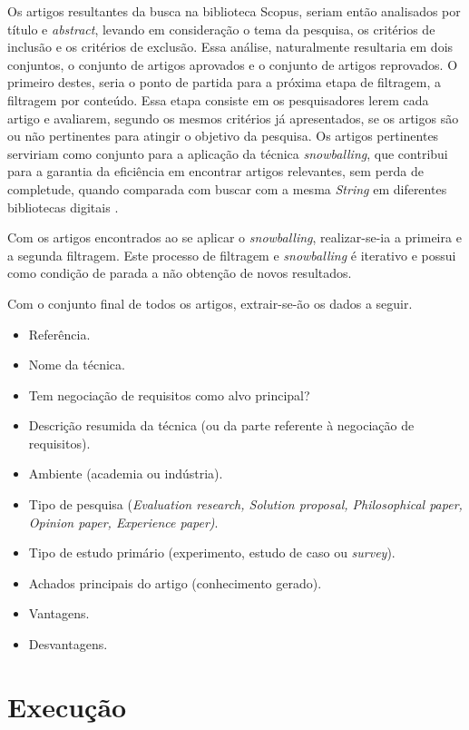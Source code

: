 Os artigos resultantes da busca na biblioteca Scopus, seriam então analisados
por título e \textit{abstract}, levando em consideração o tema da pesquisa, os
critérios de inclusão e os critérios de exclusão.
Essa análise, naturalmente resultaria em dois conjuntos, o conjunto de artigos
aprovados e o conjunto de artigos reprovados. O primeiro destes, seria o ponto
de partida para a próxima etapa de filtragem, a filtragem por conteúdo.
Essa etapa consiste em os pesquisadores lerem cada artigo e avaliarem, segundo
os mesmos critérios já apresentados, se os artigos são ou não pertinentes para atingir o objetivo da pesquisa.
 Os artigos pertinentes serviriam como conjunto para a aplicação da técnica
 \textit{snowballing}, que contribui para a garantia da eficiência em encontrar
 artigos relevantes, sem perda de completude, quando comparada com buscar com a
 mesma \textit{String} em diferentes bibliotecas digitais
 \cite{Badampudi:2015:EUS:2745802.2745818}.
 
Com os artigos encontrados ao se aplicar o \textit{snowballing}, realizar-se-ia
a primeira e a segunda filtragem.
Este processo de filtragem e \textit{snowballing} é iterativo e possui como
condição de parada a não obtenção de novos resultados.

Com o conjunto final de todos os artigos, extrair-se-ão os dados a seguir.

\begin{itemize}
\setlength{
\itemsep}{1pt}
\setlength{
\itemindent}{20pt}
\item {Referência.}
\item {Nome da técnica.}
\item {Tem negociação de requisitos como alvo principal?}
\item {Descrição resumida da técnica (ou da parte referente à negociação de requisitos).}
\item {Ambiente (academia ou indústria).}
\item {Tipo de pesquisa (\textit{Evaluation research,
Solution proposal, Philosophical paper, Opinion paper, Experience paper)}.}
\item {Tipo de estudo primário (experimento, estudo de caso ou
\textit{survey}).}
\item {Achados principais do artigo (conhecimento gerado).}
\item {Vantagens.}
\item {Desvantagens.}
\end{itemize}

\section{Execução}

